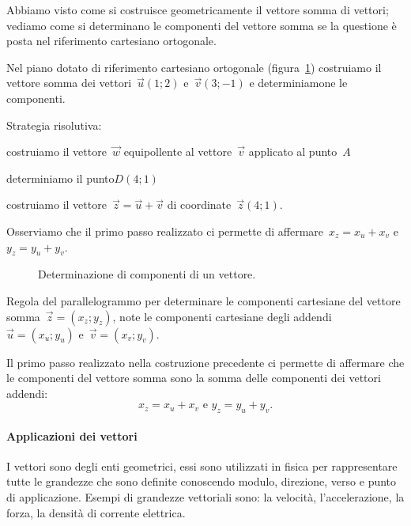 Abbiamo visto come si costruisce geometricamente il vettore somma di vettori; 
vediamo come si determinano le componenti del vettore somma se la questione
è posta nel riferimento cartesiano ortogonale.

\begin{exrig}
\begin{esempio}
Nel piano dotato di riferimento cartesiano ortogonale (figura~\ref{fig:F.10}) 
costruiamo il vettore somma dei vettori~$\vec{u}(1;2)$ e~$\vec{v}(3;-1)$ e 
determiniamone
le componenti.

Strategia risolutiva:
\begin{enumeratea}
\item costruiamo il vettore~$\vec{w}$ equipollente al vettore~$\vec{v}$ 
applicato al punto~$A$
\item determiniamo il punto$D(4;1)$
\item costruiamo il vettore~$\vec{z}=\vec{u}+\vec{v}$ di 
coordinate~$\vec{z}(4;1)$.
\end{enumeratea}
Osserviamo che il primo passo realizzato ci permette di affermare~$x_z=x_u+x_v$ 
e~$y_z=y_u+y_v$.
\end{esempio}
\end{exrig}
\newpage
\begin{inaccessibleblock}
 \begin{figure}[t]
\centering

\caption{Determinazione di componenti di un vettore.}\label{fig:F.10}
\end{figure}
\end{inaccessibleblock}

\begin{procedura} Regola del parallelogrammo per determinare le componenti 
cartesiane del vettore somma~$\vec{z}=(x_z;y_z)$,
note le componenti cartesiane degli addendi~$\vec{u}=(x_u;y_u)$ 
e~$\vec{v}=(x_v;y_v)$.

Il primo passo realizzato nella costruzione precedente ci permette di affermare 
che le componenti del vettore somma sono la somma
delle componenti dei vettori addendi:\[x_z=x_u+x_v\text{ e }y_z=y_u+y_v.\]
\end{procedura}


\paragraph{Applicazioni dei vettori}
I vettori sono degli enti geometrici, essi sono utilizzati in fisica per 
rappresentare tutte le grandezze che sono definite conoscendo modulo, direzione,
verso e punto di applicazione. Esempi di grandezze vettoriali sono: la 
velocità, l'accelerazione, la forza, la densità di corrente elettrica.

